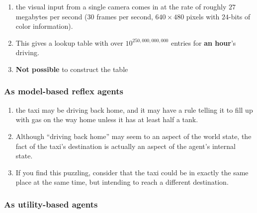 \begin{enumerate}[itemsep=0.2cm]
    \item the visual input from a single camera comes in at the rate of roughly $27$ megabytes per second ($30$ frames per second, $640 \times 480$ pixels with $24$-bits of color information). 
    \hfill \cite{ai/book/Artificial-Intelligence-A-Modern-Approach/Russell-Norvig}
    
    \item This gives a lookup table with over $10^{250,000,000,000}$ entries for \textbf{an hour}’s driving.
    \hfill \cite{ai/book/Artificial-Intelligence-A-Modern-Approach/Russell-Norvig}

    \item \textbf{Not possible} to construct the table
    \hfill \cite{ai/book/Artificial-Intelligence-A-Modern-Approach/Russell-Norvig}
\end{enumerate}



\subsubsection{As model-based reflex agents}

\begin{enumerate}[itemsep=0.2cm]
    \item the taxi may be driving back home, and it may have a rule telling it to fill up with gas on the way home unless it has at least half a tank. 
    \hfill \cite{ai/book/Artificial-Intelligence-A-Modern-Approach/Russell-Norvig}
    
    \item Although “driving back home” may seem to an aspect of the world state, the fact of the taxi’s destination is actually an aspect of the agent’s internal state. 
    \hfill \cite{ai/book/Artificial-Intelligence-A-Modern-Approach/Russell-Norvig}
    
    \item If you find this puzzling, consider that the taxi could be in exactly the same place at the same time, but intending to reach a different destination.
    \hfill \cite{ai/book/Artificial-Intelligence-A-Modern-Approach/Russell-Norvig}
    
\end{enumerate}


\subsubsection{As utility-based agents}

